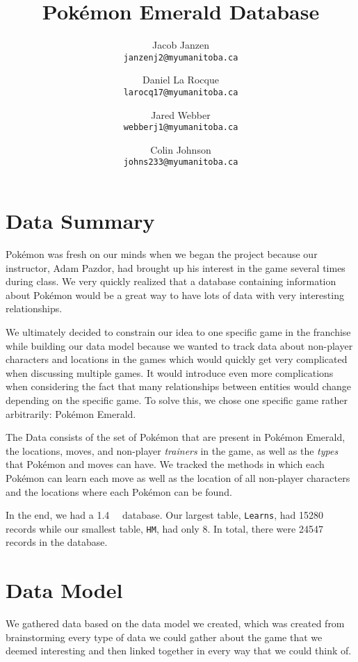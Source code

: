 \documentclass{article}
\title{Pok\'emon Emerald Database}
\author{
    Jacob Janzen\\
    \texttt{janzenj2@myumanitoba.ca} \and 
    Daniel La Rocque\\
    \texttt{larocq17@myumanitoba.ca} \and 
    Jared Webber\\
    \texttt{webberj1@myumanitoba.ca} \and 
    Colin Johnson\\
    \texttt{johns233@myumanitoba.ca}
}
\begin{document}
\maketitle
\section{Data Summary}
Pok\'emon was fresh on our minds when we began the project because our instructor, Adam Pazdor,
had brought up his interest in the game several times during class. We very quickly realized that
a database containing information about Pok\'emon would be a great way to have lots of data with
very interesting relationships.

We ultimately decided to constrain our idea to one specific game in the franchise while building
our data model because we wanted to track data about non-player characters and locations in the
games which would quickly get very complicated when discussing multiple games. It would introduce
even more complications when considering the fact that many relationships between entities would
change depending on the specific game. To solve this, we chose one specific game rather 
arbitrarily: Pok\'emon Emerald.

The Data consists of the set of Pok\'emon that are present in Pok\'emon Emerald, the locations, 
moves, and non-player \emph{trainers} in the game, as well as the \emph{types} that Pok\'emon 
and moves can have. We tracked the methods in which each Pok\'emon can learn each move as well as 
the location of all non-player characters and the locations where each Pok\'emon can be found.

In the end, we had a \SI{1.4}{\mega\byte} database. Our largest table, \verb+Learns+, had 15280
records while our smallest table, \verb+HM+, had only 8. In total, there were 24547 records in
the database.

\section{Data Model}
We gathered data based on the data model we created, which was created from brainstorming every
type of data we could gather about the game that we deemed interesting and then linked together
in every way that we could think of.
\end{document}
